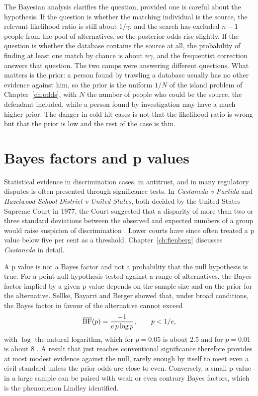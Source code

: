 The Bayesian analysis clarifies the question, provided one is careful about the hypothesis. If the question is whether the matching individual is the source, the relevant likelihood ratio is still about $1/\gamma$, and the search has excluded $n-1$ people from the pool of alternatives, so the posterior odds rise slightly. If the question is whether the database contains the source at all, the probability of finding at least one match by chance is about $n\gamma$, and the frequentist correction answers that question. The two camps were answering different questions. What matters is the prior: a person found by trawling a database usually has no other evidence against him, so the prior is the uniform $1/N$ of the island problem of Chapter~\ref{ch:odds}, with $N$ the number of people who could be the source, the defendant included, while a person found by investigation may have a much higher prior. The danger in cold hit cases is not that the likelihood ratio is wrong but that the prior is low and the rest of the case is thin.

\section{Bayes factors and p values}

Statistical evidence in discrimination cases, in antitrust, and in many regulatory disputes is often presented through significance tests. In \emph{Castaneda v Partida} and \emph{Hazelwood School District v United States}, both decided by the United States Supreme Court in 1977, the Court suggested that a disparity of more than two or three standard deviations between the observed and expected numbers of a group would raise suspicion of discrimination \citep{castaneda1977,hazelwood1977}. Lower courts have since often treated a p value below five per cent as a threshold. Chapter~\ref{ch:fienberg} discusses \emph{Castaneda} in detail.

A p value is not a Bayes factor and not a probability that the null hypothesis is true. For a point null hypothesis tested against a range of alternatives, the Bayes factor implied by a given p value depends on the sample size and on the prior for the alternative. Sellke, Bayarri and Berger showed that, under broad conditions, the Bayes factor in favour of the alternative cannot exceed
\begin{equation}
\overline{\mathrm{BF}}(p) = \frac{-1}{e\, p\log p}, \qquad p < 1/e,
\label{eq:sbb}
\end{equation}
with $\log$ the natural logarithm, which for $p = 0.05$ is about $2.5$ and for $p = 0.01$ is about $8$ \citep{sellke2001}. A result that just reaches conventional significance therefore provides at most modest evidence against the null, rarely enough by itself to meet even a civil standard unless the prior odds are close to even. Conversely, a small p value in a large sample can be paired with weak or even contrary Bayes factors, which is the phenomenon Lindley identified.

